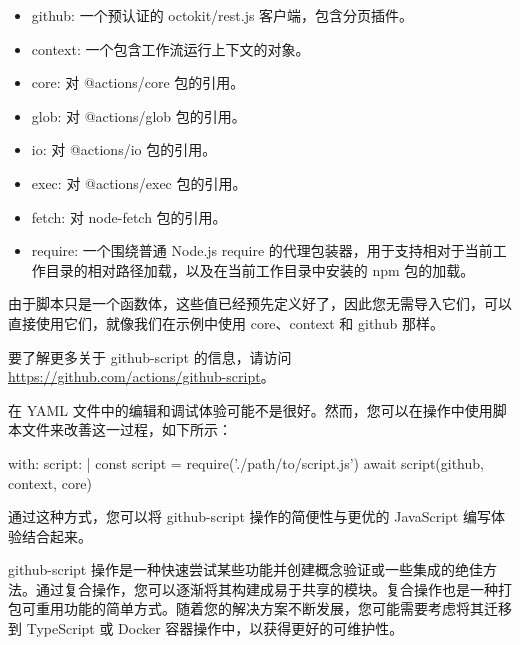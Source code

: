 \begin{itemize}
\item 
github: 一个预认证的 octokit/rest.js 客户端，包含分页插件。

\item 
context: 一个包含工作流运行上下文的对象。

\item 
core: 对 @actions/core 包的引用。

\item 
glob: 对 @actions/glob 包的引用。

\item 
io: 对 @actions/io 包的引用。

\item 
exec: 对 @actions/exec 包的引用。

\item 
fetch: 对 node-fetch 包的引用。

\item 
require: 一个围绕普通 Node.js require 的代理包装器，用于支持相对于当前工作目录的相对路径加载，以及在当前工作目录中安装的 npm 包的加载。
\end{itemize}

由于脚本只是一个函数体，这些值已经预先定义好了，因此您无需导入它们，可以直接使用它们，就像我们在示例中使用 core、context 和 github 那样。

要了解更多关于 github-script 的信息，请访问 \url{https://github.com/actions/github-script}。


在 YAML 文件中的编辑和调试体验可能不是很好。然而，您可以在操作中使用脚本文件来改善这一过程，如下所示：

\begin{shell}
with:
  script: |
    const script = require('./path/to/script.js')
    await script({github, context, core})
\end{shell}

通过这种方式，您可以将 github-script 操作的简便性与更优的 JavaScript 编写体验结合起来。

github-script 操作是一种快速尝试某些功能并创建概念验证或一些集成的绝佳方法。通过复合操作，您可以逐渐将其构建成易于共享的模块。复合操作也是一种打包可重用功能的简单方式。随着您的解决方案不断发展，您可能需要考虑将其迁移到 TypeScript 或 Docker 容器操作中，以获得更好的可维护性。











